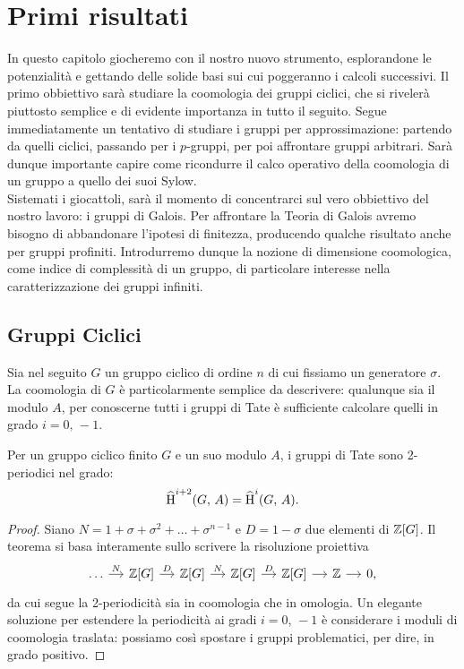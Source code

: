 \chapter{Primi risultati}
In questo capitolo giocheremo con il nostro nuovo strumento, esplorandone le potenzialità e gettando delle solide basi sui cui poggeranno i calcoli successivi. Il primo obbiettivo sarà studiare la coomologia dei gruppi ciclici, che si rivelerà piuttosto semplice e di evidente importanza in tutto il seguito. Segue immediatamente un tentativo di studiare i gruppi per approssimazione: partendo da quelli ciclici, passando per i $ p $-gruppi, per poi affrontare gruppi arbitrari. Sarà dunque importante capire come ricondurre il calco operativo della coomologia di un gruppo a quello dei suoi Sylow. \\

Sistemati i giocattoli, sarà il momento di concentrarci sul vero obbiettivo del nostro lavoro: i gruppi di Galois. Per affrontare la Teoria di Galois avremo bisogno di abbandonare l'ipotesi di finitezza, producendo qualche risultato anche per gruppi profiniti. Introdurremo dunque la nozione di dimensione coomologica, come indice di complessità di un gruppo, di particolare interesse nella caratterizzazione dei gruppi infiniti.

\section{Gruppi Ciclici}
Sia nel seguito $ G $ un gruppo ciclico di ordine $ n $ di cui fissiamo un generatore $ \sigma $. La coomologia di $ G $ è particolarmente semplice da descrivere: qualunque sia il modulo $ A $, per conoscerne tutti i gruppi di Tate è sufficiente calcolare quelli in grado $ i = 0, \, -1 $.

\begin{theorem}\label{ciclici}
	Per un gruppo ciclico finito $ G $ e un suo modulo $ A $, i gruppi di Tate sono 2-periodici nel grado:
	\[ \operatorname{\widehat{H}}^{i+2}(G, \, A) = \operatorname{\widehat{H}}^{i}(G, \, A). \]
\end{theorem}

\begin{proof}
	Siano $ N = 1 + \sigma + \sigma^2 + \dots + \sigma^{n-1} $ e $ D = 1 - \sigma $ due elementi di $ \mathbb{Z}[G] $. Il teorema si basa interamente sullo scrivere la risoluzione proiettiva
	\[ \begin{tikzcd}[column sep = small]
	\dots \rar["N"]
	& \Z[G] \rar["D"]
	& \Z[G] \rar["N"]
	& \Z[G] \rar["D"]
	& \Z[G] \rar
	& \Z \rar & 0,
	\end{tikzcd} \]
	da cui segue la 2-periodicità sia in coomologia che in omologia. Un elegante soluzione per estendere la periodicità ai gradi $ i = 0, \, -1 $ è considerare i moduli di coomologia traslata: possiamo così spostare i gruppi problematici, per dire, in grado positivo. 
\end{proof}

